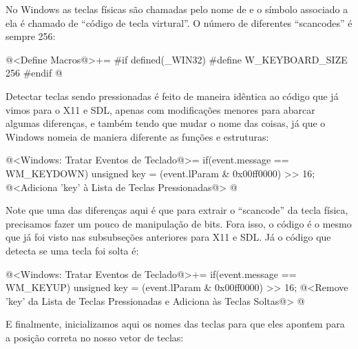 
No Windows as teclas físicas são chamadas pelo nome
de  e o símbolo associado a ela é chamado de
``código de tecla virtural''. O número de diferentes ``scancodes'' é
sempre 256:

\iniciocodigo
@<Define Macros@>+=
#if defined(_WIN32)
#define W_KEYBOARD_SIZE 256
#endif
@
\fimcodigo

Detectar teclas sendo pressionadas é feito de maneira idêntica ao
código que já vimos para o X11 e SDL, apenas com modificações menores
para abarcar algumas diferenças, e também tendo que mudar o nome das
coisas, já que o Windows nomeia de maniera diferente as funções e
estruturas:

\iniciocodigo
@<Windows: Tratar Eventos de Teclado@>=
if(event.message == WM_KEYDOWN){
  unsigned key = (event.lParam & 0x00ff0000) >> 16;
  @<Adiciona 'key' à Lista de Teclas Pressionadas@>
}
@
\fimcodigo

Note que uma das diferenças aqui é que para extrair o ``scancode'' da
tecla física, precisamos fazer um pouco de manipulação de bits. Fora
isso, o código é o mesmo que já foi visto nas subsubseções anteriores
para X11 e SDL. Já o código que detecta se uma tecla foi solta é:

\iniciocodigo
@<Windows: Tratar Eventos de Teclado@>+=
if(event.message == WM_KEYUP){
  unsigned key = (event.lParam & 0x00ff0000) >> 16;
  @<Remove 'key' da Lista de Teclas Pressionadas e Adiciona às Teclas Soltas@>
}
@
\fimcodigo

E finalmente, inicializamos aqui os nomes das teclas para que eles
apontem para a posição correta no nosso vetor de teclas:

